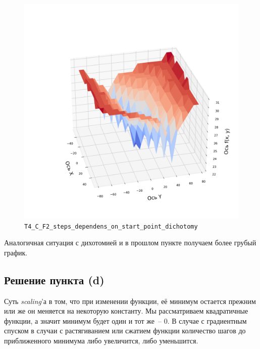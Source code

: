\documentclass[12pt, a4paper, oneside, final]{article}
\begin{document}
	\begin{figure}[H]
		\centering
		\includegraphics[scale=0.68]{Image/T4_C_F2_steps_dependens_on_start_point_dichotomy.png}
		\caption*{\texttt{T4\_C\_F2\_steps\_dependens\_on\_start\_point\_dichotomy}}
	\end{figure}
	Аналогичная ситуация с дихотомией и в прошлом пункте получаем более грубый график.
	\subsection*{Решение пункта (d)}
	Суть \textit{scaling}'а в том, что при изменении функции, её минимум остается прежним или же он меняется на некоторую константу. Мы рассматриваем квадратичные функции, а значит минимум будет один и тот же~-- $0$. В случае с градиентным спуском в случаи с растягиванием или сжатием функции количество шагов до приближенного минимума либо увеличится, либо уменьшится.
\end{document}
